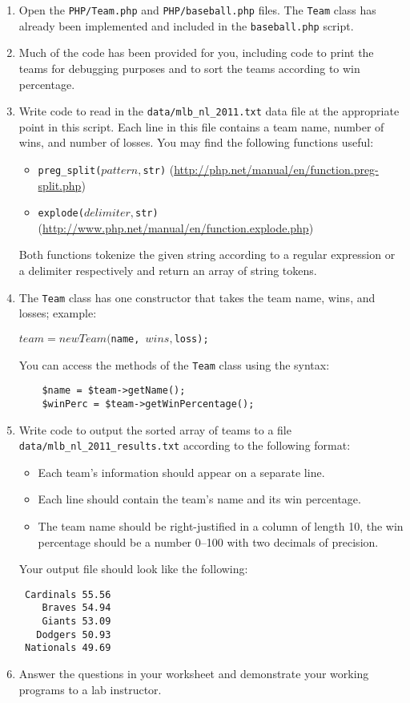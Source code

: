 \documentclass[12pt]{scrartcl}
\begin{document}
\begin{enumerate}
  \item Open the \texttt{PHP/Team.php} and 
  	\texttt{PHP/baseball.php} files.  The \texttt{Team} 
	class has already been implemented and included in the 
	\texttt{baseball.php} script.
  \item Much of the code has been provided for you, including code to 
	print the teams for debugging purposes and to sort the teams according 
	to win percentage.
  \item Write code to read in the \texttt{data/mlb_nl_2011.txt} 
	data file at the appropriate point in this script.  Each line in this file contains a
	team name, number of wins, and number of losses. You may find the following functions
	useful:
  \begin{itemize}
	 \item \texttt{preg_split($pattern, $str)} (\url{http://php.net/manual/en/function.preg-split.php})
	 \item \texttt{explode($delimiter, $str)} (\url{http://www.php.net/manual/en/function.explode.php})
  \end{itemize}
  	Both functions tokenize the given string according to a regular 
	expression or a delimiter respectively and return an array of 
	string tokens.  
  \item The \texttt{Team} class has one constructor that 
	takes the team name, wins, and losses; example:
	
	\texttt{$team = new Team($name, $wins, $loss);}
	
	You can access the methods of the \texttt{Team} class using
	the syntax: 
	
	\begin{verbatim}
	$name = $team->getName();
	$winPerc = $team->getWinPercentage();
	\end{verbatim}
	
  \item Write code to output the sorted array of teams to a file 
  	\texttt{data/mlb_nl_2011_results.txt} according 
	to the following format:
	\begin{itemize}
	  \item Each team's information should appear on a separate line.
	  \item Each line should contain the team's name and its win percentage.
      \item The team name should be right-justified in a column of length 
	  	10, the win percentage should be a number 0--100 with two decimals 
		of precision.
	\end{itemize}
	Your output file should look like the following:

\begin{verbatim}
 Cardinals 55.56
    Braves 54.94
    Giants 53.09
   Dodgers 50.93
 Nationals 49.69
\end{verbatim}

  \item Answer the questions in your worksheet and demonstrate your 
  	working programs to a lab instructor.
\end{enumerate}
\end{document}
